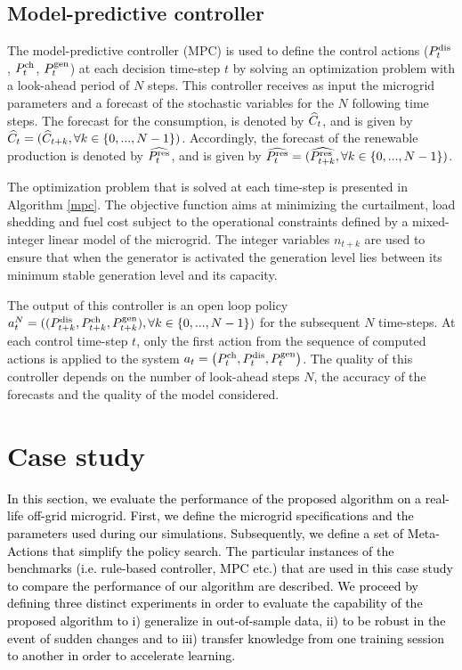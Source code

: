 \documentclass{article}
\begin{document}
\subsection{Model-predictive controller}\label{sec: optcontroller}

    The model-predictive controller (MPC) is used to define the control actions ($P^{\text{dis}}_t$, $P^{\text{ch}}_t$, $P^\text{gen}_t$) at each decision time-step $t$ by solving an optimization problem with a look-ahead period of $N$ steps. This controller receives as input the microgrid parameters and a forecast of the stochastic variables for the $N$ following time steps. The forecast for the consumption, is denoted by $\widehat{C}_{t}$, and is given by $\widehat{C}_{t} = (\widehat{C}_{t+k}, \forall k \in \{0,...,N-1 \})$. Accordingly, the forecast of the renewable production is denoted by $\widehat{P^\text{res}_{t}}$, and is given by $\widehat{P^\text{res}_{t}} = (\widehat{P^\text{res}_{t+k}}, \forall k \in \{0,...,N-1 \})$. 
    
    The optimization problem that is solved at each time-step is presented in Algorithm \ref{mpc}. The objective function aims at minimizing the curtailment, load shedding and fuel cost subject to the operational constraints defined by a mixed-integer linear model of the microgrid. The integer variables $n_{t+k}$ are used to ensure that when the generator is activated the generation level lies between its minimum stable generation level and its capacity. 
    
    The output of this controller is an open loop policy $a^{N}_t = ((P^{\text{dis}}_{t+k},P^{\text{ch}}_{t+k},P^\text{gen}_{t+k}), \forall k \in \{0,...,N-1 \})$ for the subsequent $N$ time-steps. At each control time-step $t$, only the first action from the sequence of computed actions is applied to the system $a_t= \left(P^{\text{ch}}_{t}, P^{\text{dis}}_{t}, P^\text{gen}_{t} \right)$. The quality of this controller depends on the number of look-ahead steps $N$, the accuracy of the forecasts and the quality of the model considered. 

\section{Case study}\label{sec: CaseStudy}

\textcolor{black}{In this section, we evaluate the performance of the proposed algorithm on a real-life off-grid microgrid. First, we define the microgrid specifications and the parameters used during our simulations. Subsequently, we define a set of Meta-Actions that simplify the policy search. The particular instances of the benchmarks (i.e. rule-based controller, MPC etc.) that are used in this case study to compare the performance of our algorithm are described. We proceed by defining three distinct experiments in order to evaluate the capability of the proposed algorithm to i) generalize in out-of-sample data, ii) to be robust in the event of sudden changes and to iii) transfer knowledge from one training session to another in order to accelerate learning.}
\end{document}
